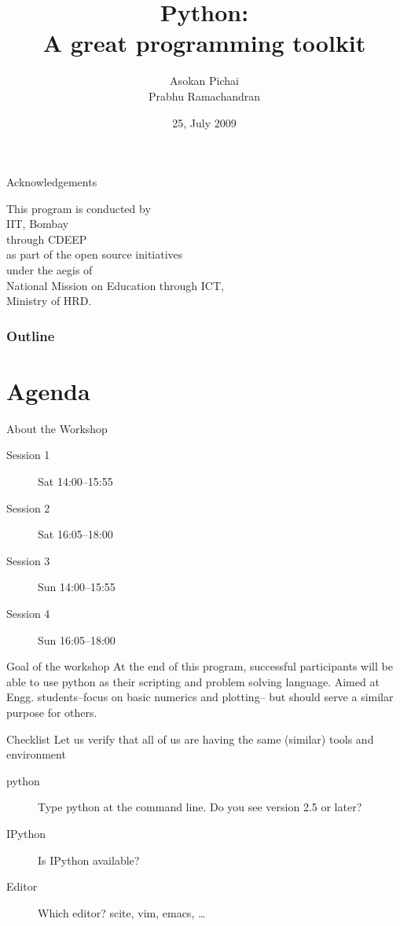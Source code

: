 \documentclass[14pt,compress]{beamer}
\title[Basic Python]{Python:\\A great programming toolkit}
\author[Asokan \& Prabhu] {Asokan Pichai\\Prabhu Ramachandran}
\institute[IIT Bombay] {Department of Aerospace Engineering\\IIT Bombay}
\date[] {25, July 2009}
\begin{document}
\begin{frame}
  \titlepage
\end{frame}
\begin{frame}
  {Acknowledgements}
  \begin{center}
  This program is conducted by\\
  IIT, Bombay\\
  through CDEEP\\as part of  the open source initiatives\\
  under the aegis of\\
  \alert{National Mission on Education through ICT,} \\
  Ministry of HRD.
  \end{center}
\end{frame}

\begin{frame}
  \frametitle{Outline}
  \tableofcontents
\end{frame}

%

\section{Agenda}
\begin{frame}{About the Workshop}
  \begin{description}
	\item[Session 1] Sat 14:00--15:55
	\item[Session 2] Sat 16:05--18:00
	\item[Session 3] Sun 14:00--15:55
	\item[Session 4] Sun 16:05--18:00 
  \end{description}

  \begin{block}{Goal of the workshop}
	At the end of this program, successful participants will be able to use python as their scripting and problem solving language. Aimed at Engg. students--focus on basic numerics and plotting-- but should serve a similar purpose for others. 
  \end{block}
\end{frame}

\begin{frame}{Checklist}
  Let us verify that all of us are having the same (similar) tools and environment
  \begin{description}
	\item[python] Type python at the command line. Do you see version 2.5 or later?
	\item[IPython] Is IPython available?
	\item[Editor] Which editor? scite, vim, emacs, \ldots
  \end{description}
\end{frame}
\end{document}
